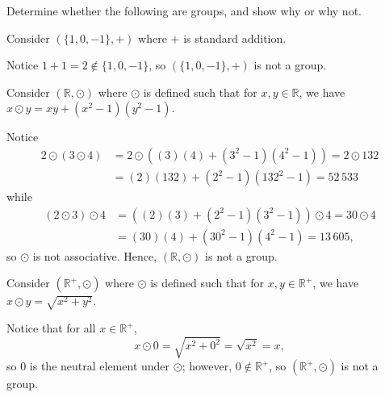 
Determine whether the following are groups, and show why or why not.
\begin{exer}
Consider $ (\{1,0,-1\},+) $ where $ + $ is standard addition.
\end{exer}
\begin{sltn}
Notice $ 1+1=2\notin\{1,0,-1\} $, so $ (\{1,0,-1\},+) $ is not a group.
\end{sltn}

\begin{exer}
Consider $ (\mathbb{R},\odot) $ where $ \odot $ is defined such that for $ x,y\in\mathbb{R} $, we have $ x\odot y=xy+(x^2-1)(y^2-1) $.
\end{exer}
\begin{sltn}
Notice
\begin{align*}
    2\odot(3\odot 4) &= 2\odot\left((3)(4)+(3^2-1)(4^2-1)\right)=2\odot 132 \\
    &= (2)(132)+(2^2-1)(132^2-1)=52\,533
\end{align*}
while
\begin{align*}
    (2\odot 3)\odot 4 &= \left((2)(3)+(2^2-1)(3^2-1)\right)\odot 4=30\odot 4 \\
    &= (30)(4)+(30^2-1)(4^2-1)=13\,605,
\end{align*}
so $ \odot $ is not associative. Hence, $ (\mathbb{R},\odot) $ is not a group.
\end{sltn}

\begin{exer}
Consider $ (\mathbb{R}^+,\odot) $ where $ \odot $ is defined such that for $ x,y\in\mathbb{R}^+ $, we have $ x\odot y=\sqrt{x^2+y^2} $.
\end{exer}
\begin{sltn}
Notice that for all $ x\in\mathbb{R}^+ $,
\begin{equation*}
    x\odot 0=\sqrt{x^2+0^2}=\sqrt{x^2}=x,
\end{equation*}
so $ 0 $ is the neutral element under $ \odot $; however, $ 0\notin\mathbb{R}^+ $, so $ (\mathbb{R}^+,\odot) $ is not a group.
\end{sltn}

